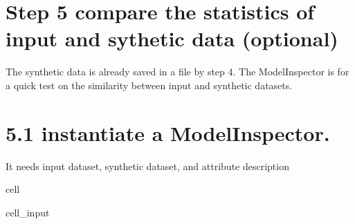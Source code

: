 \documentclass[letterpaper,10pt,english]{jupyterBook}
\begin{document}
\section{Step 5 compare the statistics of input and sythetic data (optional)}
\label{\detokenize{src/test/SynthNAV0:id12}}
\sphinxAtStartPar
The synthetic data is already saved in a file by step 4. The ModelInspector is for a quick test on the similarity between input and synthetic datasets.


\section{5.1 instantiate a ModelInspector.}
\label{\detokenize{src/test/SynthNAV0:id13}}
\sphinxAtStartPar
It needs input dataset, synthetic dataset, and attribute description

\begin{sphinxuseclass}{cell}\begin{sphinxVerbatimInput}

\begin{sphinxuseclass}{cell_input}
\begin{sphinxVerbatim}[commandchars=\\\{\}]
   
  
  \PYG{p}{[}\PYG{p}{]}

    
\end{sphinxVerbatim}

\end{sphinxuseclass}\end{sphinxVerbatimInput}

\end{sphinxuseclass}
\end{document}
